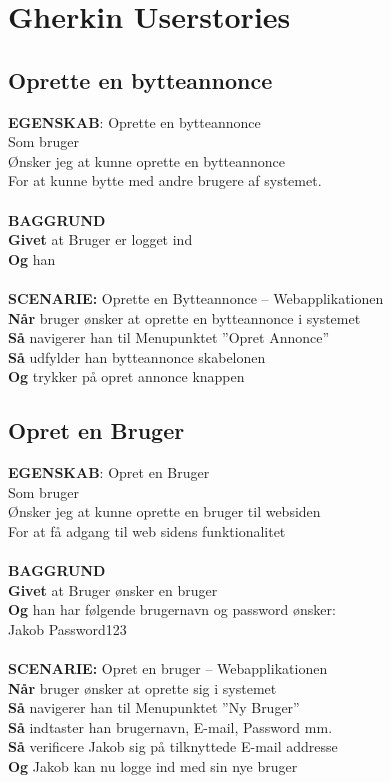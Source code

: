 \chapter{Gherkin Userstories}

\section{Oprette en bytteannonce}
{\color{blue}\textbf{EGENSKAB}:} Oprette en bytteannonce \\
Som bruger \\
Ønsker jeg at kunne oprette en bytteannonce \\
For at kunne bytte med andre brugere af systemet.\\ \\
{\color{blue}\textbf{BAGGRUND}} \\
{\color{blue}\textbf{Givet}} at Bruger er logget ind \\
{\color{blue}\textbf{Og}} han \\\\
{\color{blue}\textbf{SCENARIE:}} Oprette en Bytteannonce – Webapplikationen \\
{\color{blue}\textbf{Når}} bruger ønsker at oprette en bytteannonce i systemet \\
{\color{blue}\textbf{Så}} navigerer han til Menupunktet ”Opret Annonce” \\
{\color{blue}\textbf{Så}} udfylder han bytteannonce skabelonen \\
{\color{blue}\textbf{Og}} trykker på opret annonce knappen

\section{Opret en Bruger}
{\color{blue}\textbf{EGENSKAB}:} Opret en Bruger \\
Som bruger \\
Ønsker jeg at kunne oprette en bruger til websiden \\
For at få adgang til web sidens funktionalitet\\ \\
{\color{blue}\textbf{BAGGRUND}} \\
{\color{blue}\textbf{Givet}} at Bruger ønsker en bruger \\
{\color{blue}\textbf{Og}} han har følgende brugernavn og password ønsker:\\
Jakob    Password123 \\\\
{\color{blue}\textbf{SCENARIE:}} Opret en bruger – Webapplikationen \\
{\color{blue}\textbf{Når}} bruger ønsker at oprette sig i systemet \\
{\color{blue}\textbf{Så}} navigerer han til Menupunktet ”Ny Bruger” \\
{\color{blue}\textbf{Så}} indtaster han brugernavn, E-mail, Password mm.\\
{\color{blue}\textbf{Så}} verificere Jakob sig på tilknyttede E-mail addresse\\
{\color{blue}\textbf{Og}} Jakob kan nu logge ind med sin nye bruger

